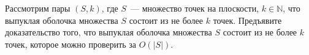 Рассмотрим пары $(S, k)$, где $S$~--- множество точек на плоскости, $k \in \mathbb{N}$, что выпуклая оболочка множества $S$
состоит из не более $k$ точек. Предъявите доказательство того, что выпуклая оболочка множества $S$ состоит из не более $k$
точек, которое можно проверить за $O(|S|)$.